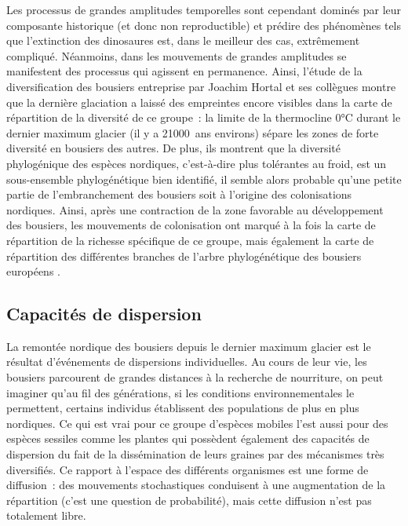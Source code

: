 Les processus de grandes amplitudes temporelles sont cependant dominés
par leur composante historique (et donc non reproductible) et prédire
des phénomènes tels que l'extinction des dinosaures est, dans le
meilleur des cas, extrêmement compliqué. Néanmoins, dans les mouvements
de grandes amplitudes se manifestent des processus qui agissent en
permanence. Ainsi, l'étude de la diversification des bousiers entreprise
par Joachim Hortal et ses collègues \citep{Hortal2011} montre que la
dernière glaciation a laissé des empreintes encore visibles dans la
carte de répartition de la diversité de ce groupe~: la limite de la
thermocline 0°C durant le dernier maximum glacier (il y a 21000~ans
environs) sépare les zones de forte diversité en bousiers des autres. De
plus, ils montrent que la diversité phylogénique des espèces nordiques,
c'est-à-dire plus tolérantes au froid, est un sous-ensemble
phylogénétique bien identifié, il semble alors probable qu'une petite
partie de l'embranchement des bousiers soit à l'origine des
colonisations nordiques. Ainsi, après une contraction de la zone
favorable au développement des bousiers, les mouvements de colonisation
ont marqué à la fois la carte de répartition de la richesse spécifique
de ce groupe, mais également la carte de répartition des différentes
branches de l'arbre phylogénétique des bousiers européens
\citep{Hortal2011}.

\subsection*{Capacités de dispersion}\label{capacituxe9s-de-dispersion}

La remontée nordique des bousiers depuis le dernier maximum glacier est
le résultat d'événements de dispersions individuelles. Au cours de leur
vie, les bousiers parcourent de grandes distances à la recherche de
nourriture, on peut imaginer qu'au fil des générations, si les
conditions environnementales le permettent, certains individus
établissent des populations de plus en plus nordiques. Ce qui est vrai
pour ce groupe d'espèces mobiles l'est aussi pour des espèces sessiles
comme les plantes qui possèdent également des capacités de dispersion du
fait de la dissémination de leurs graines par des mécanismes très
diversifiés. Ce rapport à l'espace des différents organismes est une
forme de diffusion~: des mouvements stochastiques conduisent à une
augmentation de la répartition (c'est une question de probabilité), mais
cette diffusion n'est pas totalement libre.

